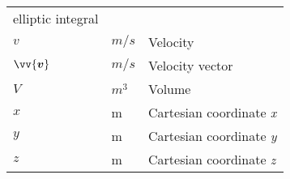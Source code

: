 \begin{longtable}[l]{p{100pt} p{70pt} p{150pt}}
                                          elliptic integral                                 \\
    $v$              & $m/s$            & Velocity                                          \\
    $\vv{\bm{v}}$    & $m/s$            & Velocity vector                                   \\
    $V$              & $m^3$            & Volume                                            \\
    $x$              & m                & Cartesian coordinate \emph{x}                     \\
    $y$              & m                & Cartesian coordinate \emph{y}                     \\
    $z$              & m                & Cartesian coordinate \emph{z}                     \\
\end{longtable}
\vspace{1cm}

